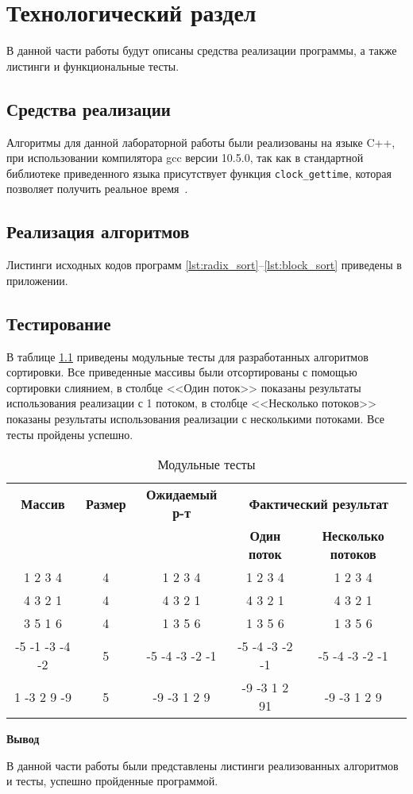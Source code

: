 \chapter{Технологический раздел}

В данной части работы будут описаны средства реализации программы, а также листинги и функциональные тесты.

\section{Средства реализации}
Алгоритмы для данной лабораторной работы были реализованы на языке C++, при использовании компилятора gcc версии 10.5.0, так как в стандартной библиотеке приведенного языка
присутствует функция \texttt{clock\_gettime}, которая  позволяет получить реальное время~\cite{cpp-time}.



\section{Реализация алгоритмов}
Листинги исходных кодов программ  \ref{lst:radix_sort}--\ref{lst:block_sort} приведены в приложении.


\section{Тестирование}

В таблице \ref{t:mod_tests} приведены модульные  тесты для разработанных алгоритмов сортировки. Все приведенные массивы были отсортированы с помощью сортировки слиянием, в столбце <<Один поток>>
показаны результаты использования реализации с 1 потоком,  в столбце <<Несколько потоков>> показаны результаты использования реализации с несколькими потоками. Все тесты пройдены успешно.
\begin{table}[ht]
	\small
	\begin{center}
		\begin{threeparttable}
			\caption{Модульные тесты}
			\label{t:mod_tests}
			\begin{tabular}{|c|c|c|c|c|}
				\hline
				\bfseries Массив
				& \bfseries Размер
				& \bfseries Ожидаемый р-т
				& \multicolumn{2}{c|}{\bfseries Фактический результат} \\ \cline{4-5}
				& & & \bfseries Один поток & \bfseries  Несколько потоков \\
				\hline
				1 2 3 4  & 4 & 1 2 3 4 & 1 2 3 4 & 1 2 3 4 \\
				\hline
				4 3 2 1 & 4 & 4 3 2 1 & 4 3 2 1 & 4 3 2 1 \\
				\hline
				3 5 1 6 & 4 & 1 3 5 6  & 1 3 5 6 & 1 3 5 6 \\
				\hline
				-5 -1 -3 -4 -2 & 5 & -5 -4 -3 -2 -1 & -5 -4 -3 -2 -1 & -5 -4 -3 -2 -1 \\
				\hline
				1 -3 2 9 -9 & 5 & -9 -3 1 2 9  & -9 -3 1 2 91 & -9 -3 1 2 9 \\
				\hline
			\end{tabular}	
		\end{threeparttable}	
	\end{center}
\end{table}

\textbf{Вывод}

В данной части работы были представлены листинги реализованных алгоритмов и тесты, успешно пройденные программой.